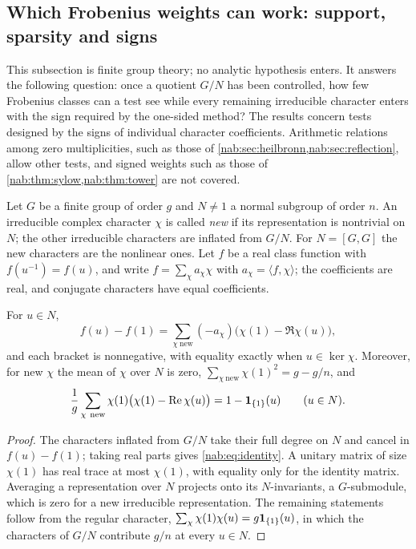 \subsection{Which Frobenius weights can work: support, sparsity and signs}\label{nab:sec:extremal}
\begingroup\raggedright
{}
\endgroup

This subsection is finite group theory; no analytic hypothesis enters. It answers the
following question: once a quotient $G/N$ has been controlled, how few Frobenius classes
can a test see while every remaining irreducible character enters with the sign required
by the one-sided method? The results concern tests designed by the signs of individual
character coefficients. Arithmetic relations among zero multiplicities, such as those of
\cref{nab:sec:heilbronn,nab:sec:reflection}, allow other tests, and signed weights such as
those of \cref{nab:thm:sylow,nab:thm:tower} are not covered.

Let $G$ be a finite group of order $g$ and $N\ne1$ a normal subgroup of order $n$. An
irreducible complex character $\chi$ is called \emph{new} if its representation is
nontrivial on $N$; the other irreducible characters are inflated from $G/N$. For
$N=[G,G]$ the new characters are the nonlinear ones. Let $f$ be a real class function with
$f(u^{-1})=f(u)$, and write $f=\sum_\chi a_\chi\chi$ with $a_\chi=\langle f,\chi\rangle$;
the coefficients are real, and conjugate characters have equal coefficients.

\begin{lemma}\label{nab:lem:identity}
For $u\in N$,
\begin{equation}\label{nab:eq:identity}
 f(u)-f(1)=\sum_{\chi\ \mathrm{new}}(-a_\chi)\bigl(\chi(1)-\Re\chi(u)\bigr),
\end{equation}
and each bracket is nonnegative, with equality exactly when $u\in\ker\chi$. Moreover, for
new $\chi$ the mean of $\chi$ over $N$ is zero, $\sum_{\chi\ \mathrm{new}}\chi(1)^2=g-g/n$,
and
\begin{equation}\label{nab:eq:regular}
 \frac1g\sum_{\chi\ \mathrm{new}}\chi(1)\bigl(\chi(1)-\Re\chi(u)\bigr)=1-\nabone_{\set1}(u)
 \qquad(u\in N).
\end{equation}
\end{lemma}
\begin{proof}
The characters inflated from $G/N$ take their full degree on $N$ and cancel in
$f(u)-f(1)$; taking real parts gives \eqref{nab:eq:identity}. A unitary matrix of size
$\chi(1)$ has real trace at most $\chi(1)$, with equality only for the identity matrix.
Averaging a representation over $N$ projects onto its $N$-invariants, a $G$-submodule,
which is zero for a new irreducible representation. The remaining statements follow from
the regular character, $\sum_\chi\chi(1)\chi(u)=g\mathbf{1}_{\{1\}}(u)$, in which the
characters of $G/N$ contribute $g/n$ at every $u\in N$.
\end{proof}

